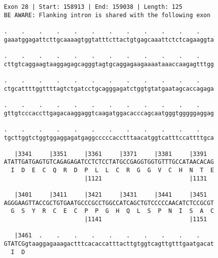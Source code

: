 \documentclass{article}
\begin{document}
\begin{Verbatim}
Exon 28 | Start: 158913 | End: 159038 | Length: 125
BE AWARE: Flanking intron is shared with the following exon
 
.    .    .    .    .    .    .    .    .    .    .    .    
gaaatggagattcttgcaaaagtggtatttcttactgtgagcaaattctctcagaaggta
  
.    .    .    .    .    .    .    .    .    .    .    .    
cttgtcaggaagtaaggagagcagggtagtgcaggagaagaaaataaaccaagagtttgg
  
.    .    .    .    .    .    .    .    .    .    .    .    
ctgcattttggttttagtctgatcctgcagggagatctggtgtatgaatagcaccagaga
  
.    .    .    .    .    .    .    .    .    .    .    .    
gttgtcccaccttgagacaaggaggtcaagatggacacccagcaatgggtgggggaggag
  
.    .    .    .    .    .    .    .    .    .    .    .    
tgcttggtctggtggaggagatgaggcccccacctttaacatggtcatttccattttgca
  
   |3341     |3351     |3361     |3371     |3381     |3391  
ATATTGATGAGTGTCAGAGAGATCCTCTCCTATGCCGAGGTGGTGTTTGCCATAACACAG
  I  D  E  C  Q  R  D  P  L  L  C  R  G  G  V  C  H  N  T  E
                       |1121                         |1131  
  
   |3401     |3411     |3421     |3431     |3441     |3451  
AGGGAAGTTACCGCTGTGAATGCCCGCCTGGCCATCAGCTGTCCCCCAACATCTCCGCGT
  G  S  Y  R  C  E  C  P  P  G  H  Q  L  S  P  N  I  S  A  C
                       |1141                         |1151  
  
   |3461  .    .    .    .    .    .    .    .    .    .    
GTATCGgtaaggagaaagactttcacaccatttacttgtggtcagttgtttgaatgacat
  I  D                                                      
\end{Verbatim}
\newpage
\end{document}
